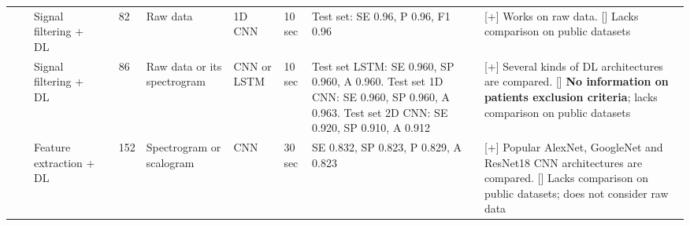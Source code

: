 \documentclass[5p,twocolumn,lefttitle]{elsarticle}
\begin{document}
\begin{table*}[!ht]
{\begin{tabularx}{2\textwidth}{@{}m{2.5em}p{7em}p{10em}lp{2em}p{12em}p{7em}p{3em}p{17em}X@{}}
                        \cmidrule(l){3-10} 
                            &                                                         & Signal filtering + DL                                          & \cite{DBLP:journals/jms/UrtnasanPJL18}   & 82            & Raw data                                                                                                          & 1D CNN                              & 10 sec                                     & Test set: SE 0.96, P 0.96, F1 0.96                                                                                                                                                         & [+] Works on raw data. [] Lacks comparison on public datasets                                                                                                                                                                                                                                                                                                                                                       \\
                        \cmidrule(l){3-10} 
                            &                                                         & Signal filtering + DL                                          & \cite{DBLP:journals/cmpb/UrtnasanKPJL19} & 86            & Raw data or its spectrogram                                                                                    & CNN or LSTM                         & 10 sec                                     & Test set LSTM: SE 0.960, SP 0.960, A 0.960. Test set 1D CNN: SE 0.960, SP 0.960, A 0.963. Test set 2D CNN: SE  0.920, SP 0.910, A 0.912                                                           & [+] Several kinds of DL architectures are compared. [] \textbf{No information on patients exclusion criteria}; lacks comparison on public datasets      \\
                        \cmidrule(l){3-10} 
                            &                                                         &   Feature extraction + DL                                          & \cite{nasifoglu2021obstructive} & 152            & Spectrogram or scalogram                                                                                    & CNN                  & 30 sec                                     &  SE 0.832, SP 0.823, P 0.829, A 0.823                                       & [+] Popular AlexNet, GoogleNet and ResNet18 CNN architectures are compared. [] Lacks comparison on public datasets; does not consider raw data     \\

\end{tabularx}}
\end{table*}
\end{document}
